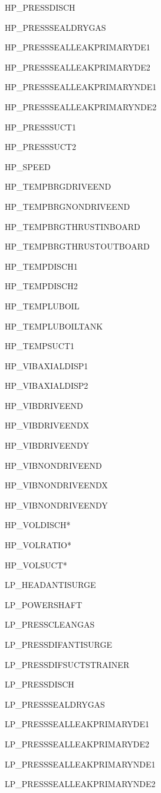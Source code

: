 \documentclass[11pt]{article} %
\theoremstyle{plain}
\theoremstyle{definition}
\begin{document}
\begin{appendices}
\begin{multicols}{2}
\begin{enumerate}
{\item HP\_PRESSDISCH
\item HP\_PRESSSEALDRYGAS
\item HP\_PRESSSEALLEAKPRIMARYDE1
\item HP\_PRESSSEALLEAKPRIMARYDE2
\item HP\_PRESSSEALLEAKPRIMARYNDE1
\item HP\_PRESSSEALLEAKPRIMARYNDE2
\item HP\_PRESSSUCT1
\item HP\_PRESSSUCT2
\item HP\_SPEED
\item HP\_TEMPBRGDRIVEEND
\item HP\_TEMPBRGNONDRIVEEND
\item HP\_TEMPBRGTHRUSTINBOARD
\item HP\_TEMPBRGTHRUSTOUTBOARD
\item HP\_TEMPDISCH1
\item HP\_TEMPDISCH2
\item HP\_TEMPLUBOIL
\item HP\_TEMPLUBOILTANK
\item HP\_TEMPSUCT1
\item HP\_VIBAXIALDISP1
\item HP\_VIBAXIALDISP2
\item HP\_VIBDRIVEEND
\item HP\_VIBDRIVEENDX
\item HP\_VIBDRIVEENDY
\item HP\_VIBNONDRIVEEND
\item HP\_VIBNONDRIVEENDX
\item HP\_VIBNONDRIVEENDY
\item HP\_VOLDISCH*
\item HP\_VOLRATIO*
\item HP\_VOLSUCT*
\item LP\_HEADANTISURGE
\item LP\_POWERSHAFT
\item LP\_PRESSCLEANGAS
\item LP\_PRESSDIFANTISURGE
\item LP\_PRESSDIFSUCTSTRAINER
\item LP\_PRESSDISCH
\item LP\_PRESSSEALDRYGAS
\item LP\_PRESSSEALLEAKPRIMARYDE1
\item LP\_PRESSSEALLEAKPRIMARYDE2
\item LP\_PRESSSEALLEAKPRIMARYNDE1
\item LP\_PRESSSEALLEAKPRIMARYNDE2
}
\end{enumerate}
\end{multicols}
\end{appendices}
\end{document}
